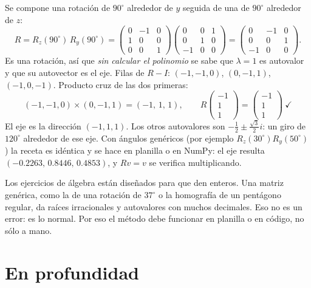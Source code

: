 Se compone una rotación de \(90^\circ\) alrededor de \(y\) seguida de una de \(90^\circ\)
alrededor de \(z\):
\[
  R=R_z(90^\circ)\,R_y(90^\circ)=
  \begin{pmatrix}0&-1&0\\1&0&0\\0&0&1\end{pmatrix}
  \begin{pmatrix}0&0&1\\0&1&0\\-1&0&0\end{pmatrix}
  =\begin{pmatrix}0&-1&0\\0&0&1\\-1&0&0\end{pmatrix}.
\]
Es una rotación, así que \emph{sin calcular el polinomio} se sabe que \(\lambda=1\) es
autovalor y que su autovector es el eje. Filas de \(R-I\): \((-1,-1,0)\), \((0,-1,1)\),
\((-1,0,-1)\). Producto cruz de las dos primeras:
\[
  (-1,-1,0)\times(0,-1,1)=(-1,\,1,\,1),
  \qquad
  R\begin{pmatrix}-1\\1\\1\end{pmatrix}=\begin{pmatrix}-1\\1\\1\end{pmatrix}\ \checkmark
\]
El eje es la dirección \((-1,1,1)\). Los otros autovalores son \(-\frac12\pm\frac{\sqrt3}2 i\):
un giro de \(120^\circ\) alrededor de ese eje. Con ángulos genéricos (por ejemplo
\(R_z(30^\circ)R_y(50^\circ)\)) la receta es idéntica y se hace en planilla o en NumPy: el
eje resulta \((-0.2263,\,0.8446,\,0.4853)\), y \(Rv=v\) se verifica multiplicando.

\begin{atencion}
Los ejercicios de álgebra están diseñados para que den enteros. Una matriz genérica, como
la de una rotación de \(37^\circ\) o la homografía de un pentágono regular, da raíces
irracionales y autovalores con muchos decimales. Eso no es un error: es lo normal. Por eso
el método debe funcionar en planilla o en código, no sólo a mano.
\end{atencion}

\section{En profundidad}

